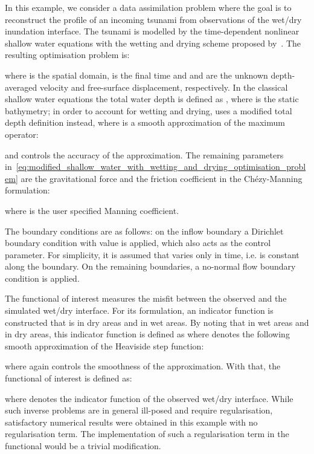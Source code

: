 \documentclass[prodmode,acmtoms]{acmsmall}
\begin{document}
In this example, we consider a data assimilation problem where the goal is to reconstruct 
the profile of an incoming tsunami from observations of the wet/dry inundation interface.
The tsunami is modelled by the time-dependent nonlinear shallow water equations with the wetting and drying scheme proposed by~.
The resulting optimisation problem is: 
 
where  is the spatial domain,  is the final time and  and  are the unknown depth-averaged velocity and free-surface displacement, respectively.
In the classical shallow water equations the total water depth is defined as , where  is the static bathymetry; 
in order to account for wetting and drying,  uses a modified total depth definition  instead, where  is a smooth approximation of the maximum operator:

and  controls the accuracy of the approximation.
The remaining parameters in~\eqref{eq:modified_shallow_water_with_wetting_and_drying_optimisation_problem} are the gravitational force  and the friction coefficient in the Ch\'{e}zy-Manning formulation: 

where  is the user specified Manning coefficient.

The boundary conditions are as follows: on the inflow boundary  a Dirichlet boundary condition with value  is applied, which also acts as the control parameter. 
For simplicity, it is assumed that  varies only in time, i.e. is constant along the boundary. 
On the remaining boundaries, a no-normal flow boundary condition is applied.

The functional of interest  measures the misfit between the observed and the simulated wet/dry interface.
For its formulation, an indicator function is constructed that is  in dry areas and  in wet areas. 
By noting that  in wet areas and  in dry areas, this indicator function is defined as   where 
 denotes the following smooth approximation of the Heaviside step function:

where again  controls the smoothness of the approximation.
With that, the functional of interest is defined as:

where  denotes the indicator function of the observed wet/dry interface.
While such inverse problems are in general ill-posed and require regularisation, satisfactory numerical results were obtained in this example with no
regularisation term. The implementation of such a regularisation term in the functional would be a trivial modification. 
\end{document}
